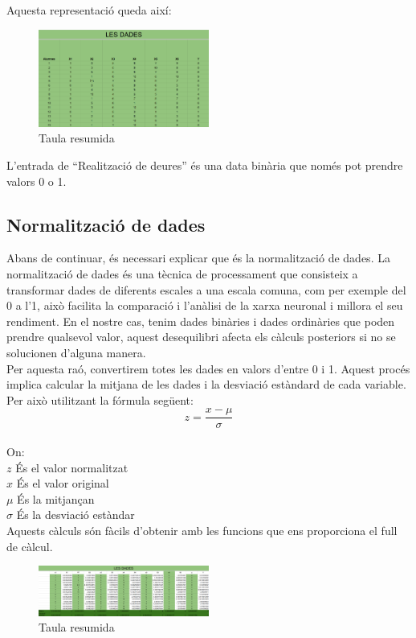 Aquesta representació queda així:

\begin{figure}[H]
    \centering
    \includegraphics[width=0.5\textwidth]{./figures/Dades_resumides.png}
    \caption{Taula resumida}
\end{figure}

L'entrada de ``Realització de deures'' és una data binària que només pot prendre valors 0 o 1.
\subsection{Normalització de dades}\label{subsec:24}
Abans de continuar, és necessari explicar que és la normalització de dades.
La normalització de dades és una tècnica de processament que consisteix a transformar dades de diferents escales a una escala comuna, com per exemple del 0 a l'1, això facilita la comparació i l'anàlisi de la xarxa neuronal i millora el seu rendiment. En el nostre cas, tenim dades binàries i dades ordinàries que poden prendre qualsevol valor, aquest desequilibri afecta els càlculs posteriors si no se solucionen d'alguna manera. \\

Per aquesta raó, convertirem totes les dades en valors d'entre 0 i 1. Aquest procés implica calcular la mitjana de les dades i la desviació estàndard de cada variable. Per això utilitzant la fórmula següent:\\
$$z = \frac{x - \mu}{\sigma}$$\\

On:\\
$z$ És el valor normalitzat\\
$x$ És el valor original\\
$\mu$ És la mitjançan\\
$\sigma$ És la desviació estàndar\\

Aquests càlculs són fàcils d'obtenir amb les funcions que ens proporciona el full de càlcul.

\begin{figure}[H]
    \centering
    \includegraphics[width=0.5\textwidth]{./figures/Dades_normalitzades.png}
    \caption{Taula resumida}
\end{figure}

